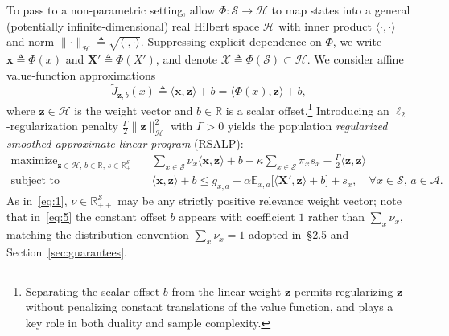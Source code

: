 \documentclass[11pt,letterpaper]{article}
\newcommand{\E}{\mathbb{E}}
\newcommand{\R}{\mathbb{R}}
\newcommand{\ip}[2]{\langle #1, #2\rangle}
\newcommand{\norm}[1]{\lVert #1\rVert}
\newcommand{\defeq}{\triangleq}
\theoremstyle{definition}
\begin{document}
To pass to a non-parametric setting, allow $\Phi:\mathcal{S}\to\mathcal{H}$ to map states into a general (potentially infinite-dimensional) real Hilbert space $\mathcal{H}$ with inner product $\ip{\cdot}{\cdot}$ and norm $\norm{\cdot}_{\mathcal{H}} \defeq \sqrt{\ip{\cdot}{\cdot}}$. Suppressing explicit dependence on $\Phi$, we write $\mathbf{x} \defeq \Phi(x)$ and $\mathbf{X}' \defeq \Phi(X')$, and denote $\mathcal{X} \defeq \Phi(\mathcal{S}) \subset \mathcal{H}$. We consider affine value-function approximations
\begin{equation}
 \tilde{J}_{\mathbf{z},b}(x) \defeq \ip{\mathbf{x}}{\mathbf{z}} + b = \ip{\Phi(x)}{\mathbf{z}} + b,
 \tag{4}\label{eq:4}
\end{equation}
where $\mathbf{z}\in\mathcal{H}$ is the weight vector and $b\in\R$ is a scalar offset.\footnote{Separating the scalar offset $b$ from the linear weight $\mathbf{z}$ permits regularizing $\mathbf{z}$ without penalizing constant translations of the value function, and plays a key role in both duality and sample complexity.} Introducing an $\ell_2$-regularization penalty $\frac{\Gamma}{2}\norm{\mathbf{z}}_{\mathcal{H}}^2$ with $\Gamma > 0$ yields the population \emph{regularized smoothed approximate linear program} (RSALP):
\begin{equation}
\begin{aligned}
 \text{maximize}_{\mathbf{z}\in\mathcal{H},\, b\in\R,\, s\in\R_+^{\mathcal{S}}}\quad &
   \sum_{x\in\mathcal{S}} \nu_x \ip{\mathbf{x}}{\mathbf{z}} + b - \kappa \sum_{x\in\mathcal{S}} \pi_x s_x - \frac{\Gamma}{2}\ip{\mathbf{z}}{\mathbf{z}} \\
 \text{subject to}\quad &
   \ip{\mathbf{x}}{\mathbf{z}} + b \le g_{x,a} + \alpha \E_{x,a}\bigl[\ip{\mathbf{X}'}{\mathbf{z}} + b\bigr] + s_x,
   \quad \forall x\in\mathcal{S},\, a\in\mathcal{A}.
\end{aligned}
\tag{5}\label{eq:5}
\end{equation}
As in~\eqref{eq:1}, $\nu\in\R_{++}^{\mathcal{S}}$ may be any strictly positive relevance weight vector; note that in~\eqref{eq:5} the constant offset $b$ appears with coefficient $1$ rather than $\sum_x \nu_x$, matching the distribution convention $\sum_x \nu_x = 1$ adopted in~\S2.5 and Section~\ref{sec:guarantees}.
\end{document}
